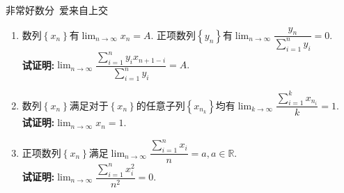 \documentclass[a4paper,oneside]{ctexart}
\begin{document}
\pagestyle{empty}
\begin{center}\large 非常好数分\ 爱来自上交\end{center}
\begin{enumerate}[1.]
    \item 数列$\left\{ x_n\right\}$有$\displaystyle\lim_{n\to\infty}{x_n}=A$.
          正项数列$\left\{ y_n\right\}$有$\displaystyle\lim_{n\to\infty}\dfrac{y_n}{\sum_{i=1}^{n}{y_i}}=0$.\\
          \textbf{试证明:}$\displaystyle\lim_{n\to\infty}{\dfrac{\sum_{i=1}^{n}{y_ix_{n+1-i}}}{\sum_{i=1}^{n}{y_i}}}=A.$
    \newpage
    \item 数列$\left\{ x_n\right\}$满足对于$\left\{ x_n\right\}$的任意子列$\left\{ x_{n_k}\right\}$均有$\displaystyle\lim_{k\to\infty}{\dfrac{\sum_{i=1}^{k}{x_{n_i}}}{k}}=1$.\\
          \textbf{试证明:}$\displaystyle\lim_{n\to\infty}{x_n}=1$.
    \newpage
    \item 正项数列$\left\{ x_n\right\}$满足$\displaystyle\lim_{n\to\infty}{\dfrac{\sum_{i=1}^{n}{x_i}}{n}}=a,a\in\mathbb{R}$.\\
          \textbf{试证明:}$\displaystyle\lim_{n\to\infty}{\dfrac{\sum_{i=1}^{n}{x_i^2}}{n^2}}=0$.
\end{enumerate}
\end{document}
